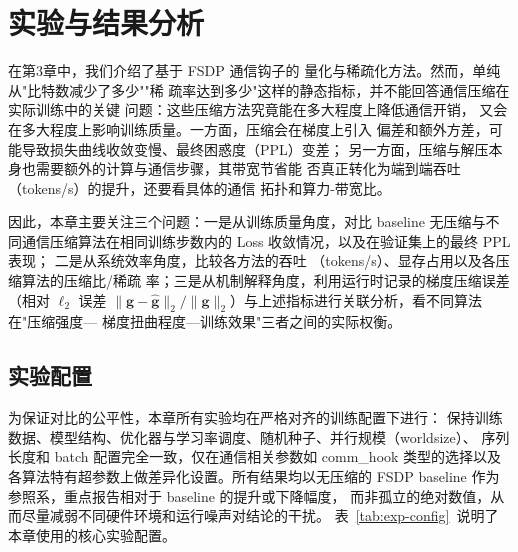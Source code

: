 
\chapter{实验与结果分析}

在第3章中，我们介绍了基于 FSDP 通信钩子的
量化与稀疏化方法。然而，单纯从"比特数减少了多少""稀
疏率达到多少"这样的静态指标，并不能回答通信压缩在实际训练中的关键
问题：这些压缩方法究竟能在多大程度上降低通信开销，
又会在多大程度上影响训练质量。一方面，压缩会在梯度上引入
偏差和额外方差，可能导致损失曲线收敛变慢、最终困惑度（PPL）变差；
另一方面，压缩与解压本身也需要额外的计算与通信步骤，其带宽节省能
否真正转化为端到端吞吐（tokens/s）的提升，还要看具体的通信
拓扑和算力-带宽比。

因此，本章主要关注三个问题：一是从训练质量角度，对比
baseline 无压缩与不同通信压缩算法在相同训练步数内的
Loss 收敛情况，以及在验证集上的最终 PPL 表现；
二是从系统效率角度，比较各方法的吞吐
（tokens/s）、显存占用以及各压缩算法的压缩比/稀疏
率；三是从机制解释角度，利用运行时记录的梯度压缩误差（相对 $\ell_2$ 误差
$\|\mathbf{g}-\hat{\mathbf{g}}\|_2/\|\mathbf{g}\|_2$）与上述指标进行关联分析，看不同算法在"压缩强度—
梯度扭曲程度—训练效果"三者之间的实际权衡。

\section{实验配置}

为保证对比的公平性，本章所有实验均在严格对齐的训练配置下进行：
保持训练数据、模型结构、优化器与学习率调度、随机种子、并行规模（worldsize）、
序列长度和 batch 配置完全一致，仅在通信相关参数如 comm\_hook
类型的选择以及各算法特有超参数上做差异化设置。所有结果均以无压缩的
FSDP baseline 作为参照系，重点报告相对于 baseline 的提升或下降幅度，
而非孤立的绝对数值，从而尽量减弱不同硬件环境和运行噪声对结论的干扰。
表~\ref{tab:exp-config}~说明了本章使用的核心实验配置。


